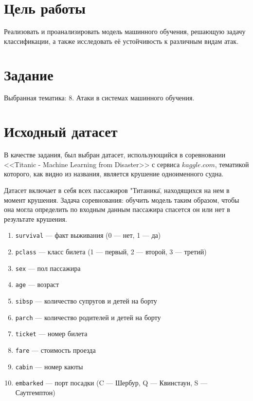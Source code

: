 \documentclass[14pt,a4paper]{extarticle}
\begin{document}
\section{Цель работы}

Реализовать и проанализировать модель машинного обучения, решающую задачу
классификации, а также исследовать её устойчивость к различным видам атак.

\section{Задание}
\begin{sloppypar}
    Выбранная тематика: 8. Атаки в системах машинного обучения.\\
\end{sloppypar}

\newpage
\section{Исходный датасет}
    В качестве задания, был выбран датасет, использующийся в соревновании
    <<Titanic - Machine Learning from Disaster>> с сервиса $kaggle.com$, тематикой
    которого, как видно из названия, является крушение одноименного судна.

    Датасет включает в себя всех пассажиров "Титаника\", находящихся на нем в момент крушения.
    Задача соревнования: обучить модель таким образом, чтобы она могла определить по входным данным
    пассажира спасется он или нет в результате крушения.

\begin{enumerate}
    \setlength{\itemindent}{2em}
    \item \texttt{survival} — факт выживания (0 — нет, 1 — да)
    \item \texttt{pclass} — класс билета (1 — первый, 2 — второй, 3 — третий)
    \item \texttt{sex} — пол пассажира
    \item \texttt{age} — возраст
    \item \texttt{sibsp} — количество супругов и детей на борту
    \item \texttt{parch} — количество родителей и детей на борту
    \item \texttt{ticket} — номер билета
    \item \texttt{fare} — стоимость проезда
    \item \texttt{cabin} — номер каюты
    \item \texttt{embarked} — порт посадки
    (C — Шербур, Q — Квинстаун, S — Саутгемптон)
\end{enumerate}
\end{document}
